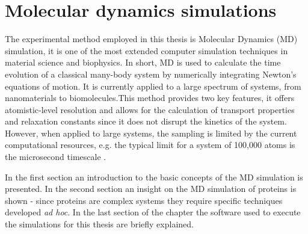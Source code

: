 \chapter{Molecular dynamics simulations}

The experimental method employed in this thesis is Molecular Dynamics (MD) simulation, it is one of the most extended computer simulation techniques in material science and biophysics. In short, MD is used to calculate the time evolution of a classical many-body system by numerically integrating Newton's equations of motion. It is currently applied to a large spectrum of systems, from nanomaterials to biomolecules.This method provides two key features, it offers atomistic-level resolution and allows for the calculation of transport properties and relaxation constants since it does not disrupt the kinetics of the system. However, when applied to large systems, the sampling is limited by the current computational resources, e.g. the typical limit for a system of 100,000 atoms is the microsecond timescale \cite{kalimeri2014thesis}.

In the first section an introduction to the basic concepts of the MD simulation is presented. In the second section an insight on the MD simulation of proteins is shown - since proteins are complex systems they require specific techniques developed \textit{ad hoc}. In the last section of the chapter the software used to execute the simulations for this thesis are briefly explained.



